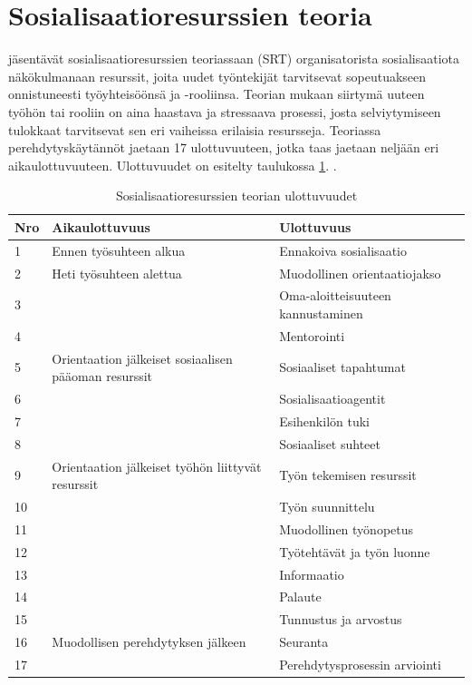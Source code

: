 \documentclass[utf8]{gradu3}
\begin{document}
\section{Sosialisaatioresurssien teoria}
\label{luku-SRT-teoria}

\textcite{saks-gruman-2012} jäsentävät sosialisaatioresurssien teoriassaan (SRT) organisatorista sosialisaatiota näkökulmanaan resurssit, joita uudet työntekijät tarvitsevat sopeutuakseen onnistuneesti työyhteisöönsä ja -rooliinsa. Teorian mukaan siirtymä uuteen työhön tai rooliin on aina haastava ja stressaava prosessi, josta selviytymiseen tulokkaat tarvitsevat sen eri vaiheissa erilaisia resursseja. Teoriassa perehdytyskäytännöt jaetaan 17 ulottuvuuteen, jotka taas jaetaan neljään eri aikaulottuvuuteen. Ulottuvuudet on esitelty taulukossa \ref{tbl:srt-ulottuvuudet}. \parencite{saks-gruman-2012}.

\begin{table}[h]
    \footnotesize
    \begin{tabular}{llll}
        \toprule
        \textbf{Nro} & \textbf{Aikaulottuvuus} & \textbf{Ulottuvuus} \\
        \toprule
        1 & Ennen työsuhteen alkua & Ennakoiva sosialisaatio \\
        \midrule
        2 & Heti työsuhteen alettua & Muodollinen orientaatiojakso \\
        3 & & Oma-aloitteisuuteen kannustaminen \\
        4 & & Mentorointi \\
        \midrule
        5 & Orientaation jälkeiset sosiaalisen pääoman resurssit & Sosiaaliset tapahtumat \\
        6 & & Sosialisaatioagentit \\
        7 & & Esihenkilön tuki \\
        8 & & Sosiaaliset suhteet \\
        \midrule
        9 & Orientaation jälkeiset työhön liittyvät resurssit & Työn tekemisen resurssit \\
        10 &&  Työn suunnittelu \\
        11 && Muodollinen työnopetus \\
        12 && Työtehtävät ja työn luonne \\
        13 && Informaatio \\
        14 && Palaute \\
        15 && Tunnustus ja arvostus \\
        \midrule
        16 & Muodollisen perehdytyksen jälkeen & Seuranta \\
        17 && Perehdytysprosessin arviointi \\
        \bottomrule
    \end{tabular}
    \caption{Sosialisaatioresurssien teorian ulottuvuudet \parencite{saks-gruman-2012}}
    \label{tbl:srt-ulottuvuudet}
\end{table}
\end{document}
